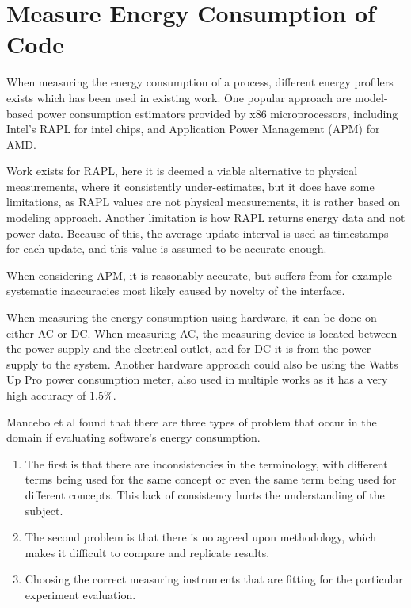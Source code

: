 
\section{Measure Energy Consumption of Code}

When measuring the energy consumption of a process, different energy profilers exists which has been used in existing work. One popular approach are model-based power consumption estimators provided by x86 microprocessors, including Intel's RAPL for intel chips, and Application Power Management (APM) for AMD.

Work exists for RAPL, here it is deemed a viable alternative to physical measurements, where it consistently under-estimates\cite[]{Dongarra2012, Hackenberg2013}, but it does have some limitations, as RAPL values are not physical measurements, it is rather based on modeling approach\cite[]{Hackenberg2013}. Another limitation is how RAPL returns energy data and not power data. Because of this, the average update interval is used as timestamps for each update, and this value is assumed to be accurate enough.\cite[]{Hackenberg2013}

When considering APM, it is reasonably accurate, but suffers from for example systematic inaccuracies most likely caused by novelty of the interface.\cite[]{Hackenberg2013}


When measuring the energy consumption using hardware, it can be done on either AC or DC. When measuring AC, the measuring device is located between the power supply and the electrical outlet, and for DC it is from the power supply to the system.\cite[]{Hackenberg2013} Another hardware approach could also be using the Watts Up Pro power consumption meter, also used in multiple works as it has a very high accuracy of $1.5\%$.\cite[]{Jagroep2015}




Mancebo et al found that there are three types of problem that occur in the domain if evaluating software's energy consumption.\cite{MANCEBO2021100558} 
\begin{enumerate}
    \item The first is that there are inconsistencies in the terminology, with different terms being used for the same concept or even the same term being used for different concepts. This lack of consistency hurts the understanding of the subject.
    \item The second problem is that there is no agreed upon methodology, which makes it difficult to compare and replicate results.
    \item Choosing the correct measuring instruments that are fitting for the particular experiment evaluation.
\end{enumerate}

